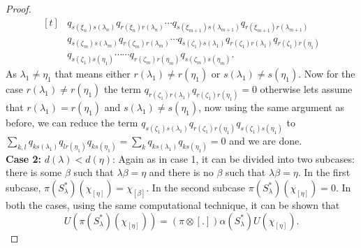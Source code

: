 \documentclass{amsart}
\theoremstyle{plain}
\theoremstyle{definition}
\theoremstyle{remark}
\numberwithin{equation}{section}
\begin{document}
\begin{proof}
\begin{equation*}
\begin{aligned}[t]
&q_{s(\xi_{n})s(\lambda_{n})}q_{r(\xi_{n})r(\lambda_{n})}
\cdots q_{s(\xi_{m+1})s(\lambda_{m+1})}q_{r(\xi_{m+1})r(\lambda_{m+1})}\\
&q_{s(\zeta_{m})s(\lambda_{m})}q_{r(\zeta_{m})r(\lambda_{m})}
\cdots
q_{s(\zeta_{1})s(\lambda_{1})}q_{r(\zeta_{1})r(\lambda_{1})}q_{r(\zeta_{1})r(\eta_{1})}\\
&q_{s(\zeta_{1})s(\eta_{1})}\cdots\cdots q_{r(\zeta_{m})r(\eta_{m})}q_{s(\zeta_{m})s(\eta_{m})}.
\end{aligned}
\end{equation*}
As 
$\lambda_{1}\neq \eta_{1}$ that means either $r(\lambda_{1})\neq r(\eta_{1})$ or $s(\lambda_{1})\neq s(\eta_{1})$. Now for the case $r(\lambda_{1})\neq r(\eta_{1})$ the term $q_{r(\zeta_{1})r(\lambda_{1})}q_{r(\zeta_{1})r(\eta_{1})}=0$ otherwise lets assume that $r(\lambda_{1})= r(\eta_{1})$ and $s(\lambda_{1})\neq s(\eta_{1})$, 
now using the same argument as before, we can reduce the term $q_{s(\zeta_{1})s(\lambda_{1})}q_{r(\zeta_{1})r(\eta_{1})}q_{s(\zeta_{1})s(\eta_{1})}$ to $\sum\limits_{k,l}q_{ks(\lambda_{1})}q_{lr(\eta_{1})}q_{ks(\eta_{1})}=\sum\limits_{k}q_{ks(\lambda_{1})}q_{ks(\eta_{1})}=0$
and we are done.\\
\textbf{Case 2:} $d(\lambda)<d(\eta)$: Again as in case 1, it can be divided into two subcases: there is some $\beta$ such that $\lambda\beta=\eta$ and there is no $\beta$ such that $\lambda\beta=\eta$. In the first subcase, $\pi(S_{\lambda}^{\ast})(\chi_{[\eta]})=\chi_{[\beta]}$. In the second subcase $\pi(S_{\lambda}^{\ast})(\chi_{[\eta]})=0$. In both the cases, using the same computational technique, it can be shown that 
\begin{displaymath}
    U(\pi(S_{\lambda}^{\ast})(\chi_{[\eta]}))=(\pi\otimes[.])\alpha(S_{\lambda}^{\ast})U(\chi_{[\eta]}).
\end{displaymath}


\end{proof}
\end{document}
